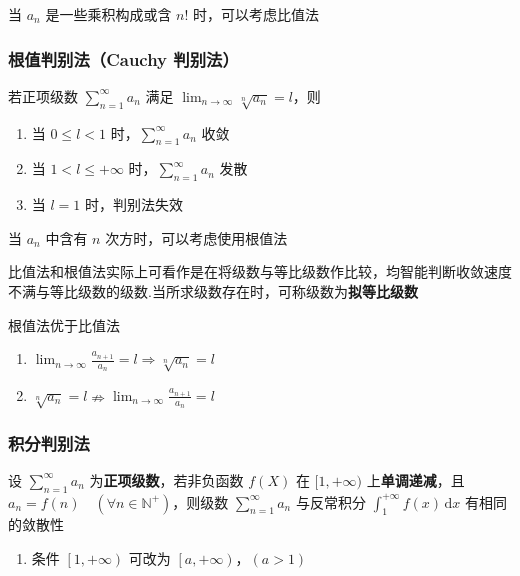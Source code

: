 \documentclass[lang = zh , final , oneside , openany , titlepage , zihao = -4 , linespread = 1.3 , baselineskip = false , cjk-font = windows , text-font = newtx , math-font = newtx , math-style = ISO , uppercase-greek = upright , integral-limits = false]{sjtureport}
\begin{document}
\begin{remark}
    当 \(a_n\) 是一些乘积构成或含 \(n!\) 时，可以考虑比值法
\end{remark}

\subsubsection{根值判别法（Cauchy 判别法）}

\begin{theorem}
若正项级数 \(\displaystyle \sum_{n=1}^\infty a_n\) 满足
\(\displaystyle \lim_{n\to\infty} \sqrt[n]{a_n} = l\)，则

\begin{enumerate}
\def\labelenumi{\arabic{enumi}.}
\item
  当 \(0\leq l<1\) 时，\(\displaystyle \sum_{n=1}^\infty a_n\) 收敛
\item
  当 \(1 < l \leq +\infty\) 时，\(\displaystyle \sum_{n=1}^\infty a_n\)
  发散
\item
  当 \(l=1\) 时，判别法失效
\end{enumerate}
\end{theorem}

\begin{remark}
    当 \(a_n\) 中含有 \(n\) 次方时，可以考虑使用根值法
\end{remark}

\begin{remark}
    比值法和根值法实际上可看作是在将级数与等比级数作比较，均智能判断收敛速度不满与等比级数的级数.当所求级数存在时，可称级数为\textbf{拟等比级数}
\end{remark}

\begin{remark}
    根值法优于比值法
    \begin{enumerate}
\item
  \(\displaystyle\lim_{n\to\infty}\frac{a_{n+1}}{a_n} =  l \Rightarrow \displaystyle \sqrt[n]{a_n} = l\)
\item
  \(\displaystyle \sqrt[n]{a_n} =l \nRightarrow \displaystyle\lim_{n\to\infty}\frac{a_{n+1}}{a_n} =  l\)
\end{enumerate}
\end{remark}

\subsubsection{积分判别法}

\begin{definition}
    设 \(\displaystyle \sum_{n=1}^\infty a_n\)
为\textbf{正项级数}，若非负函数 \(f(X)\) 在 \([1,+\infty)\)
上\textbf{单调递减}，且
\(a_n = f(n)\quad \left(\forall n \in \mathbb{N}^+\right)\)，则级数
\(\displaystyle \sum_{n=1}^\infty a_n\) 与反常积分
\(\displaystyle \int_1^{+\infty} f(x)\,\mathrm{d}x\) 有相同的敛散性

\begin{enumerate}
\item
  条件 \(\left[1,+\infty\right)\) 可改为
  \(\left[a,+\infty\right)，(a>1)\)
\end{enumerate}
\end{definition}
\end{document}
